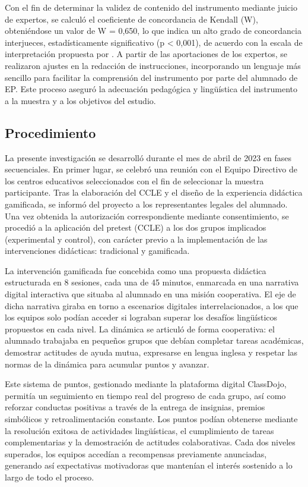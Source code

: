 \documentclass[spanish]{textolivre}
\begin{document}
Con el fin de determinar la validez de contenido del instrumento mediante juicio de expertos, se calculó el coeficiente de concordancia de Kendall (W), obteniéndose un valor de W = 0,650, lo que indica un alto grado de concordancia interjueces, estadísticamente significativo (p < 0,001), de acuerdo con la escala de interpretación propuesta por \textcite{escobar2008}. A partir de las aportaciones de los expertos, se realizaron ajustes en la redacción de instrucciones, incorporando un lenguaje más sencillo para facilitar la comprensión del instrumento por parte del alumnado de EP. Este proceso aseguró la adecuación pedagógica y lingüística del instrumento a la muestra y a los objetivos del estudio.

\subsection{Procedimiento}
La presente investigación se desarrolló durante el mes de abril de 2023 en fases secuenciales. En primer lugar, se celebró una reunión con el Equipo Directivo de los centros educativos seleccionados con el fin de seleccionar la muestra participante. Tras la elaboración del CCLE y el diseño de la experiencia didáctica gamificada, se informó del proyecto a los representantes legales del alumnado. Una vez obtenida la autorización correspondiente mediante consentimiento, se procedió a la aplicación del pretest (CCLE) a los dos grupos implicados (experimental y control), con carácter previo a la implementación de las intervenciones didácticas: tradicional y gamificada. 

La intervención gamificada fue concebida como una propuesta didáctica estructurada en 8 sesiones, cada una de 45 minutos, enmarcada en una narrativa digital interactiva que situaba al alumnado en una misión cooperativa. El eje de dicha narrativa giraba en torno a escenarios digitales interrelacionados, a los que los equipos solo podían acceder si lograban superar los desafíos lingüísticos propuestos en cada nivel. La dinámica se articuló de forma cooperativa: el alumnado trabajaba en pequeños grupos que debían completar tareas académicas, demostrar actitudes de ayuda mutua, expresarse en lengua inglesa y respetar las normas de la dinámica para acumular puntos y avanzar.

Este sistema de puntos, gestionado mediante la plataforma digital ClassDojo, permitía un seguimiento en tiempo real del progreso de cada grupo, así como reforzar conductas positivas a través de la entrega de insignias, premios simbólicos y retroalimentación constante. Los puntos podían obtenerse mediante la resolución exitosa de actividades lingüísticas, el cumplimiento de tareas complementarias y la demostración de actitudes colaborativas. Cada dos niveles superados, los equipos accedían a recompensas previamente anunciadas, generando así expectativas motivadoras que mantenían el interés sostenido a lo largo de todo el proceso. 
\end{document}
